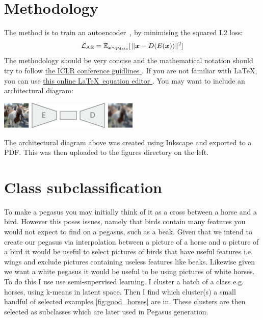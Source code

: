 \documentclass{article}
\begin{document}
\section{Methodology}
The method is to train an autoencoder~\cite{kramer1991nonlinear}, by minimising the squared L2 loss:
\begin{equation}
    \mathcal{L}_{\textrm{AE}} = \mathbb{E}_{{\bm{x}}\sim p_{\textrm{data}}}[\, \lVert {\bm{x}} - D(E({\bm{x}})) \rVert^2 ]
\end{equation}
The methodology should be very concise and the mathematical notation should try to follow \href{https://v1.overleaf.com/latex/templates/template-for-iclr-2021-conference-submission/mmpfhsxmqdkp.pdf}{the ICLR conference guidlines \faExternalLink}. If you are not familiar with \LaTeX, you can use \href{https://www.codecogs.com/latex/eqneditor.php}{this online \LaTeX~equation editor \faExternalLink}. You may want to include an architectural diagram:
\begin{center}
    \includegraphics[width=0.5\textwidth]{figures/architecture.pdf}
\end{center}
The architectural diagram above was created using Inkscape and exported to a PDF. This was then uploaded to the figures directory on the left.

\section{Class subclassification}
To make a pegasus you may initially think of it as a cross between a horse and a bird. However this poses issues, namely that birds contain many features you would not expect to find on a pegasus, such as a beak. Given that we intend to create our pegasus via interpolation between a picture of a horse and a picture of a bird it would be useful to select pictures of birds that have useful features i.e. wings and exclude pictures containing useless features like beaks. Likewise given we want a white pegasus it would be useful to be using pictures of white horses.
To do this I use use semi-supervised learning. I cluster a batch of a class e.g. horses, using k-means in latent space. Then I find which cluster(s) a small handful of selected examples \ref{fig:good_horses} are in. These clusters are then selected as subclasses which are later used in Pegasus generation.    
\end{document}
